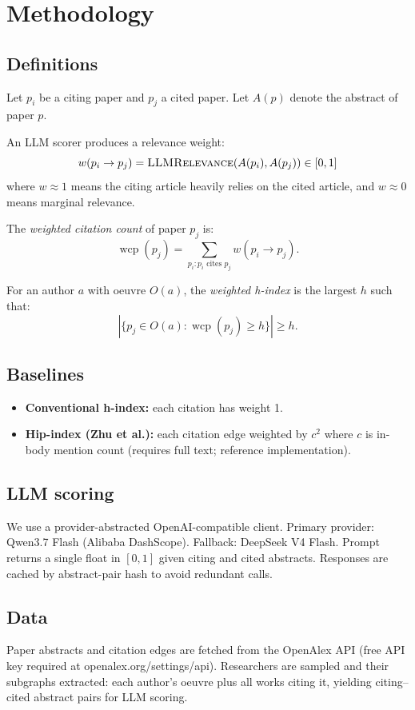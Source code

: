 \section{Methodology}

\subsection{Definitions}

Let $p_i$ be a citing paper and $p_j$ a cited paper. Let $A(p)$ denote the abstract of paper $p$.

An LLM scorer produces a relevance weight:
\[
w(p_i \to p_j) = \textsc{LLMRelevance}(A(p_i), A(p_j)) \in [0,1]
\]
where $w \approx 1$ means the citing article heavily relies on the cited article, and $w \approx 0$ means marginal relevance.

The \emph{weighted citation count} of paper $p_j$ is:
\[
\operatorname{wcp}(p_j) = \sum_{p_i : p_i \text{ cites } p_j} w(p_i \to p_j).
\]

For an author $a$ with oeuvre $O(a)$, the \emph{weighted h-index} is the largest $h$ such that:
\[
\left|\{ p_j \in O(a) : \operatorname{wcp}(p_j) \ge h \}\right| \ge h.
\]

\subsection{Baselines}

\begin{itemize}
    \item \textbf{Conventional h-index:} each citation has weight 1.
    \item \textbf{Hip-index (Zhu et al.):} each citation edge weighted by $c^2$ where $c$ is in-body mention count (requires full text; reference implementation).
\end{itemize}

\subsection{LLM scoring}

We use a provider-abstracted OpenAI-compatible client. Primary provider: Qwen3.7 Flash (Alibaba DashScope). Fallback: DeepSeek V4 Flash. Prompt returns a single float in $[0,1]$ given citing and cited abstracts. Responses are cached by abstract-pair hash to avoid redundant calls.

\subsection{Data}

Paper abstracts and citation edges are fetched from the OpenAlex API (free API key required at openalex.org/settings/api). Researchers are sampled and their subgraphs extracted: each author's oeuvre plus all works citing it, yielding citing--cited abstract pairs for LLM scoring.

